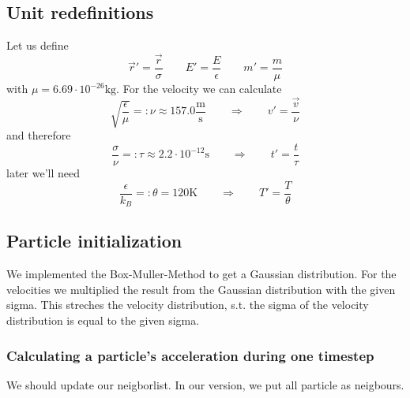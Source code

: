 \subsection{Unit redefinitions}
    Let us define
    \begin{equation}\label{redef1}
        \vec{r}'=\frac{\vec{r}}{\sigma} \qquad 
        E'=\frac{E}{\epsilon} \qquad 
        m'=\frac{m}{\mu}
    \end{equation}
    with $\mu=6.69\cdot 10^{-26}\mathrm{kg}$. For the velocity we can calculate
    \begin{equation}\label{redef_v}
        \sqrt{\frac{\epsilon}{\mu}}
        =:\nu \approx 157.0 \frac{\mathrm{m}}{\mathrm{s}} \qquad 
        \Rightarrow\qquad v'=\frac{\vec{v}}{\nu}
    \end{equation}
    and therefore 
    \begin{equation}\label{redef_t}
        \frac{\sigma}{\nu}
        =:\tau \approx2.2\cdot10^{-12}\mathrm{s}\qquad\Rightarrow
        \qquad t'=\frac{t}{\tau}
    \end{equation}
    later we'll need 
    \begin{equation}\label{redef_T}
        \frac{\epsilon}{k_B}=:\theta
        =120\mathrm{K}\qquad\Rightarrow\qquad T'=\frac{T}{\theta}
    \end{equation}

\subsection{Particle initialization}
    We implemented the Box-Muller-Method to get a Gaussian distribution. 
    For the velocities we multiplied the result from the Gaussian distribution 
    with the given sigma. This streches the velocity distribution, 
    s.t. the sigma of the velocity distribution is equal to the given sigma.
\subsubsection{Calculating a particle's acceleration during one timestep}
    We should update our neigborlist. In our version, we put all particle as 
    neigbours.
